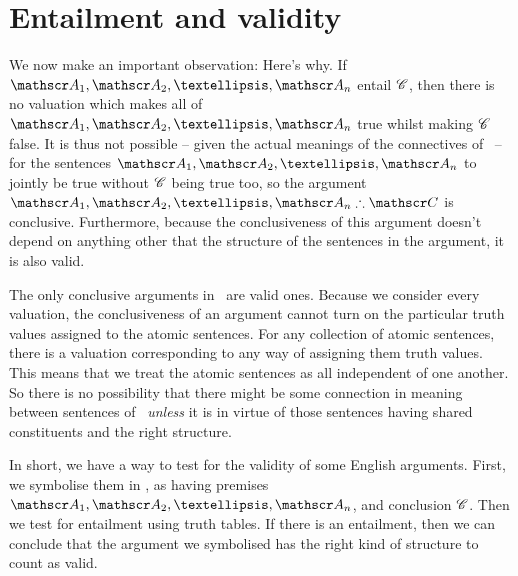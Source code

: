\section{Entailment and validity} \label{s:entailvalid}

We now make an important observation:
Here's why. If $\meta{A}_1, \meta{A}_2, …, \meta{A}_n$ entail $\mathscr{C}$, then there is no valuation which makes all of $\meta{A}_1, \meta{A}_2, …, \meta{A}_n$ true whilst making $\mathscr{C}$ false. It is thus not possible – given the actual meanings of the connectives of \TFL\ – for the sentences $\meta{A}_1, \meta{A}_2, …, \meta{A}_n$ to jointly be true without $\mathscr{C}$ being true too, so the argument $\meta{A}_1, \meta{A}_2, …, \meta{A}_n\ttherefore \meta{C}$ is conclusive. Furthermore, because the conclusiveness of this argument doesn't depend on anything other that the structure of the sentences in the argument, it is also valid. 

The only conclusive arguments in \TFL\ are valid ones. Because we consider every valuation, the conclusiveness of an argument cannot turn on the particular truth values assigned to the  atomic sentences. For any collection of atomic sentences, there is a valuation corresponding to any way of assigning them truth values. This means that we treat the atomic sentences as all independent of one another. So there is no possibility that there might be some connection in meaning between sentences of \TFL\ \emph{unless} it is in virtue of those sentences having shared constituents and the right structure.   

In short, we have a way to test for the validity of some English arguments. First, we symbolise them in \TFL, as having premises $\meta{A}_1, \meta{A}_2, …, \meta{A}_n$, and conclusion $\mathscr{C}$. Then we test for entailment using truth tables. If there is an entailment, then we can conclude that the argument we symbolised has the right kind of structure to count as valid.


